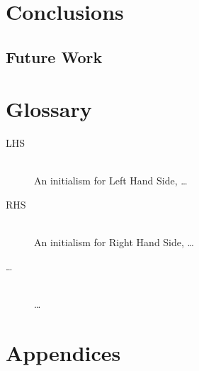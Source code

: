 \documentclass{UoYCSproject}
\begin{document}
\chapter{Conclusions}
\section{Future Work}
\chapter{Glossary}
\begin{description}
  \item[LHS] \hfill \\
  An initialism for Left Hand Side, \ldots
  \item[RHS] \hfill \\
  An initialism for Right Hand Side, \ldots
  \item[\ldots] \hfill \\
  \ldots
\end{description}



\chapter{Appendices}
\end{document}
